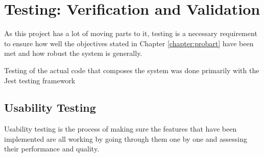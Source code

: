 \chapter{Testing: Verification and Validation}


As this project has a lot of moving parts to it, testing is a necessary requirement to ensure how well the objectives stated in Chapter \ref{chapter:probart} have been met and how robust the system is generally.

Testing of the actual code that composes the system was done primarily with the Jest testing framework \cite{jest}

\section{Usability Testing}


Usability testing is the process of making sure the features that have been implemented are all working by going through them one by one and assessing their performance and quality.

